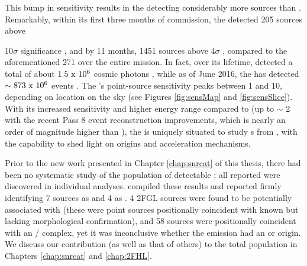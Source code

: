 This bump in sensitivity results in the \lat{} detecting considerably more sources than \egret{}. Remarkably, within its first three months of commission, the \lat{} detected 205 sources above {\rm 10$\sigma$ significance \citep{lat_3m}, and by 11 months, 1451 sources above 4$\sigma$ \citep{1FGL}, compared to  the aforementioned 271 over the entire \egret{} mission. In fact, over its lifetime, \egret{} detected a total of about ${\rm 1.5~x~10^6}$ cosmic photons \citep{Thomson93}, while as of June 2016, the \lat{} has detected ${\rm \sim 873~x~10^6}$ events . The \lat{}'s point-source sensitivity peaks between 1 and 10\gev{}, depending on location on the sky (see Figures \ref{fig:sensMap} and \ref{fig:sensSlice}). With its increased sensitivity and higher energy range compared to \egret{ }(up to $\sim$ 2\tev{} with the recent Pass 8 event reconstruction improvements, which is nearly an order of magnitude higher than \egret{}), the \lat{} is uniquely situated to study \gam{}s from \snrs{}, with the capability to shed light on \cray{} origins and acceleration mechanisms.
	
Prior to the new work presented in Chapter \ref{chap:snrcat} of this thesis, there had been no systematic study of the population of \lat{} detectable \snrs{}; all reported \lat{} \snrs{} were discovered in individual analyses.  \twofgl{} compiled these results and reported firmly identifying 7 \gam{} sources as \snrs{} and  4 as \pwne{}. 4 2FGL sources were found to be potentially associated with \snrs{} (these were point sources positionally coincident with known \snrs{} but lacking morphological confirmation), and 58 sources were positionally coincident with an \snr{}/ \pwn{} complex, yet it was inconclusive whether the \gam{} emission had an \snr{} or \pwn{} origin. We discuss our contribution (as well as that of others) to the total \lat{} \snr{} population in Chapters \ref{chap:snrcat} and \ref{chap:2FHL}. 

}

